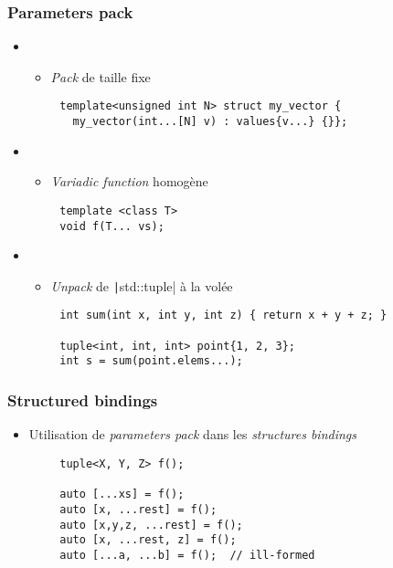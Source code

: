\documentclass[C++.tex]{subfiles}
\begin{document}
\begin{frame}[fragile]
	\frametitle{Parameters pack}
	\begin{itemize}
		\item []
		\begin{itemize}
			\item \textit{Pack} de taille fixe
		\end{itemize}
	\end{itemize}

	\begin{verbatim}
		template<unsigned int N> struct my_vector {
		  my_vector(int...[N] v) : values{v...} {}};
	\end{verbatim}

	\begin{itemize}
		\item [] 
		\begin{itemize}
			\item \textit{Variadic function} homogène
		\end{itemize}
	\end{itemize}

	\begin{verbatim}
		template <class T>
		void f(T... vs);
	\end{verbatim}


	\begin{itemize}
		\item [] 
		\begin{itemize}
			\item \textit{Unpack} de \texttt|std::tuple| à la volée
		\end{itemize}
	\end{itemize}

	\begin{verbatim}
		int sum(int x, int y, int z) { return x + y + z; }

		tuple<int, int, int> point{1, 2, 3};
		int s = sum(point.elems...);
	\end{verbatim}
\end{frame}

\begin{frame}[fragile]
	\frametitle{Structured bindings}
	\begin{itemize}
		\item Utilisation de \textit{parameters pack} dans les \textit{structures bindings}
	\end{itemize}

	\begin{verbatim}
		tuple<X, Y, Z> f();

		auto [...xs] = f();
		auto [x, ...rest] = f();
		auto [x,y,z, ...rest] = f();
		auto [x, ...rest, z] = f();
		auto [...a, ...b] = f();  // ill-formed
	\end{verbatim}
\end{frame}
\end{document}
